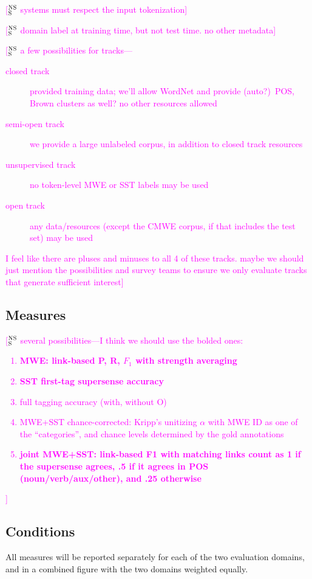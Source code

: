 \documentclass[11pt]{article}
\newcommand{\ensuretext}[1]{#1}
\newcommand{\nssmarker}{\ensuretext{\textcolor{magenta}{\ensuremath{^{\textsc{NS}}_{\textsc{S}}}}}}
\newcommand{\arkcomment}[3]{\ensuretext{\textcolor{#3}{[#1 #2]}}}
\newcommand{\nss}[1]{\arkcomment{\nssmarker}{#1}{magenta}}
\begin{document}
\nss{systems must respect the input tokenization}

\nss{domain label at training time, but not test time. no other metadata}

\nss{a few possibilities for tracks---
\begin{description}
\item[closed track] provided training data; we'll allow WordNet and provide (auto?)~POS, Brown clusters as well? 
no other resources allowed
\item[semi-open track] we provide a large unlabeled corpus, in addition to closed track resources
\item[unsupervised track] no token-level MWE or SST labels may be used
\item[open track] any data/resources (except the CMWE corpus, if that includes the test set) may be used
\end{description}
I feel like there are pluses and minuses to all 4 of these tracks. maybe we should just mention the possibilities 
and survey teams to ensure we only evaluate tracks that generate sufficient interest}

\subsection{Measures}

\nss{several possibilities---I think we should use the bolded ones:
\begin{enumerate}
\item \textbf{MWE: link-based P, R, $F_1$ with strength averaging}
\item \textbf{SST first-tag supersense accuracy}
\item full tagging accuracy (with, without O)
\item MWE+SST chance-corrected: Kripp's unitizing $\alpha$ with MWE ID as one of the ``categories'', and chance levels determined by the gold annotations
\item \textbf{joint MWE+SST: link-based F1 with matching links count as 1 if the supersense agrees, .5 if it agrees in POS (noun/verb/aux/other), and .25 otherwise}
\end{enumerate}
}

\subsection{Conditions}

All measures will be reported separately for each of the two evaluation domains, 
and in a combined figure with the two domains weighted equally. 
\end{document}
